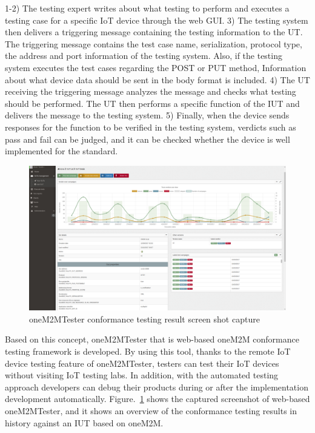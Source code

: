 1-2) The testing expert writes about what testing to perform and executes a testing case for a specific IoT device through the web GUI.
3) The testing system then delivers a triggering message containing the testing information to the UT. The triggering message contains the test case name, serialization, protocol type, the address and port information of the testing system. Also, if the testing system executes the test cases regarding the POST or PUT method, Information about what device data should be sent in the body format is included.
4) The UT receiving the triggering message analyzes the message and checks what testing should be performed. The UT then performs a specific function of the IUT and delivers the message to the testing system.
5) Finally, when the device sends responses for the function to be verified in the testing system, verdicts such as pass and fail can be judged, and it can be checked whether the device is well implemented for the standard.

\begin{figure}[H]			%
	\centering
	\includegraphics[width=\textwidth]{figures/fig_conftest_web_screen_shot.png}
    \caption{oneM2MTester conformance testing result screen shot capture}
    \label{fig:onem2mtester_conf_testing_screen_capture}
\end{figure}

Based on this concept, oneM2MTester that is web-based oneM2M conformance testing framework is developed. By using this tool, thanks to the remote IoT device testing feature of oneM2MTester, testers can test their IoT devices without visiting IoT testing labs. In addition, with the automated testing approach developers can debug their products during or after the implementation development automatically. Figure.~\ref{fig:onem2mtester_conf_testing_screen_capture} shows the captured screenshot of web-based oneM2MTester, and it shows an overview of the conformance testing results in history against an IUT based on oneM2M.

